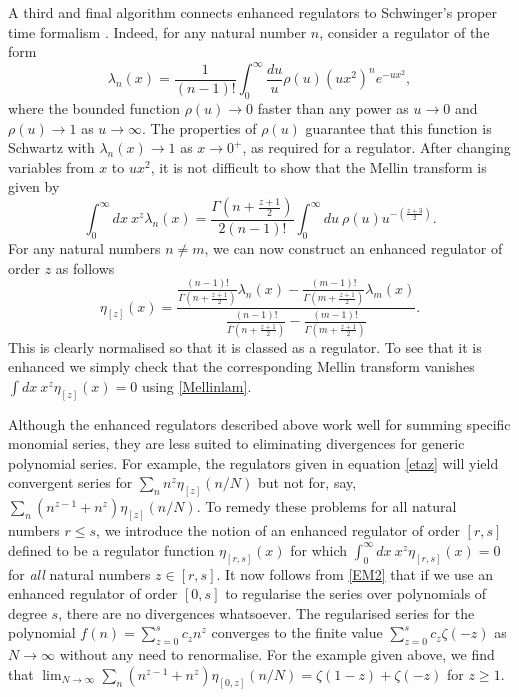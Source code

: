 \documentclass[11pt, letter]{article}
\def\be{\begin{equation}}
\def\ee{\end{equation}}
\begin{document}
A third and final algorithm connects enhanced regulators to Schwinger's proper time formalism \cite{SchwingerPT}. Indeed,  for any natural number $n$, consider a regulator of the form
\be
\lambda_n(x)=\frac{1}{(n-1)!}\int_0^\infty \frac{du}{u}  \rho(u)  (ux^2)^{n} e^{-ux^2} \label{lambdan},
\ee
where the bounded function $\rho(u) \to 0$ faster than any power as $u\to 0$ and $\rho(u) \to 1$ as $u \to \infty$. The properties of $\rho(u)$ guarantee  that this function is Schwartz with $\lambda_n(x) \to 1$ as $x \to 0^+$, as required for a regulator.  After changing variables from $x$ to $ux^2$,  it is not difficult to show that the Mellin transform is given by
\be \label{Mellinlam}
\int_0^\infty dx \ x^z \lambda_n(x)= \frac{\Gamma\left( n+\frac{z+1}{2}\right)}{2(n-1)!}\int_0^\infty du \ \rho(u)u^{-\left(\frac{z+3}{2}\right)}.
\ee
For any natural numbers $n\neq m$, we can now construct an enhanced regulator of order $z$ as follows
\be \label{enhlam}
\eta_{[z]}(x)=\frac{\frac{(n-1)!}{\Gamma\left( n+\frac{z+1}{2}\right)}\lambda_n(x)-\frac{(m-1)!}{\Gamma\left( m+\frac{z+1}{2}\right)}\lambda_m(x)}{\frac{(n-1)!}{\Gamma\left( n+\frac{z+1}{2}\right)}-\frac{(m-1)!}{\Gamma\left( m+\frac{z+1}{2}\right)}}.
\ee 
This is clearly normalised so that it is classed as a regulator. To see that it is enhanced we simply check that the corresponding Mellin transform vanishes $\int dx \  x^z\eta_{[z]}(x)=0$ using \eqref{Mellinlam}.




Although the enhanced regulators described above work well for summing specific monomial series, they are less suited to eliminating divergences for generic polynomial series. For example, the regulators given in equation \eqref{etaz} will yield convergent series for $\sum_n n^z \eta_{[z]}(n/N)$ but not for, say,  $\sum_n (n^{z-1}+n^z)\eta_{[z]}(n/N)$. To remedy these problems for all natural numbers $ r \leq s$, we introduce the notion of an enhanced regulator  of order $[r, s]$ defined to be a regulator function $\eta_{[r, s]}(x)$ for which
$
\int_0^\infty  dx  \ x^z \eta_{[r, s]}(x)=0
$
for {\it all} natural numbers $z  \in [r,  s]$. It now follows from \eqref{EM2} that if we use an enhanced regulator of order $[0,s]$ to  regularise the series over polynomials of degree $s$,  there are no divergences whatsoever. The regularised series for the polynomial  $f(n)=\sum_{z=0}^s c_z n^z$ converges to the finite  value $\sum_{z=0}^s c_z \zeta(-z)$ as $N\to \infty$ without any need to renormalise. For the example given above, we find that $\lim_{N \to \infty} \sum_n (n^{z-1}+n^z)\eta_{[0, z]}(n/N)=\zeta(1-z)+\zeta(-z)$ for $z\geq 1$.
\end{document}
